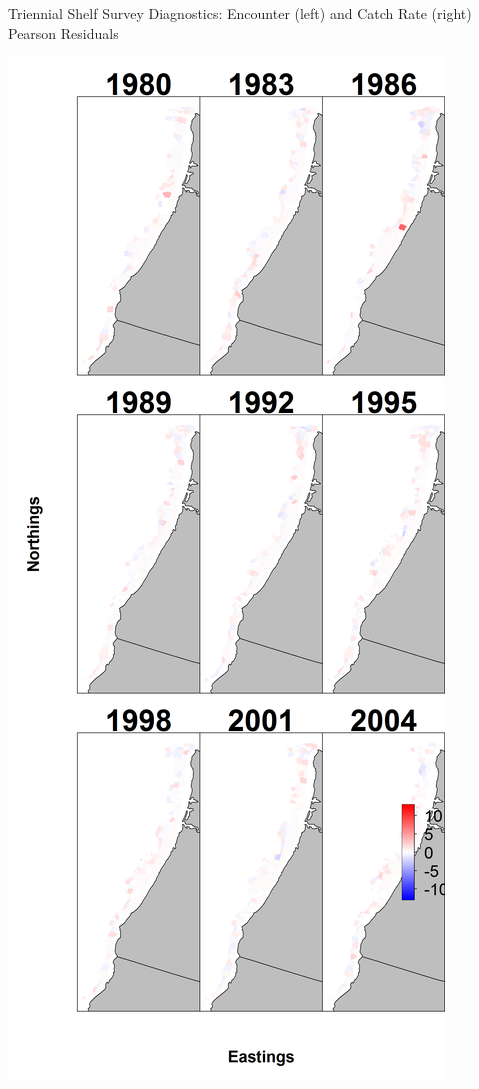 \documentclass[pdf]{beamer}\usepackage[]{graphicx}\usepackage[]{color}
\begin{document}
\begin{frame}{Triennial Shelf Survey Diagnostics: Encounter (left) and Catch Rate (right) Pearson Residuals}
  \begin{center}
  \includegraphics[scale = 0.13]{figures/Tri_maps--encounter_pearson_resid.png}

\end{center}
\end{frame}
\end{document}
